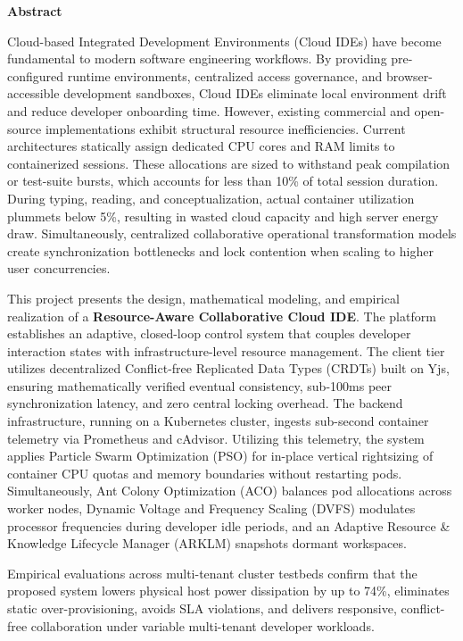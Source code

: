 \documentclass[12pt,a4paper]{report}
\begin{document}
	\begin{center}
		\vspace*{0.2cm}
		{\Huge \textbf{Abstract}}
	\end{center}
	\vspace{0.3cm}
	\thispagestyle{plain}
	Cloud-based Integrated Development Environments (Cloud IDEs) have become fundamental to modern software engineering workflows. By providing pre-configured runtime environments, centralized access governance, and browser-accessible development sandboxes, Cloud IDEs eliminate local environment drift and reduce developer onboarding time. However, existing commercial and open-source implementations exhibit structural resource inefficiencies. Current architectures statically assign dedicated CPU cores and RAM limits to containerized sessions. These allocations are sized to withstand peak compilation or test-suite bursts, which accounts for less than 10\% of total session duration. During typing, reading, and conceptualization, actual container utilization plummets below 5\%, resulting in wasted cloud capacity and high server energy draw. Simultaneously, centralized collaborative operational transformation models create synchronization bottlenecks and lock contention when scaling to higher user concurrencies.
	
	This project presents the design, mathematical modeling, and empirical realization of a \textbf{Resource-Aware Collaborative Cloud IDE}. The platform establishes an adaptive, closed-loop control system that couples developer interaction states with infrastructure-level resource management. The client tier utilizes decentralized Conflict-free Replicated Data Types (CRDTs) built on Yjs, ensuring mathematically verified eventual consistency, sub-100ms peer synchronization latency, and zero central locking overhead. The backend infrastructure, running on a Kubernetes cluster, ingests sub-second container telemetry via Prometheus and cAdvisor. Utilizing this telemetry, the system applies Particle Swarm Optimization (PSO) for in-place vertical rightsizing of container CPU quotas and memory boundaries without restarting pods. Simultaneously, Ant Colony Optimization (ACO) balances pod allocations across worker nodes, Dynamic Voltage and Frequency Scaling (DVFS) modulates processor frequencies during developer idle periods, and an Adaptive Resource \& Knowledge Lifecycle Manager (ARKLM) snapshots dormant workspaces.
	
	Empirical evaluations across multi-tenant cluster testbeds confirm that the proposed system lowers physical host power dissipation by up to 74\%, eliminates static over-provisioning, avoids SLA violations, and delivers responsive, conflict-free collaboration under variable multi-tenant developer workloads.
	
\end{document}
